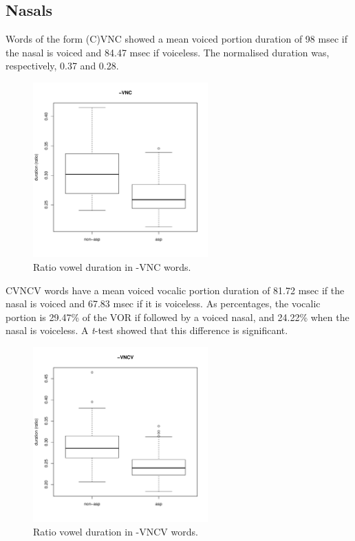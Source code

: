 \documentclass[11pt,a4paper,openany]{memoir}\usepackage[]{graphicx}\usepackage[]{color}
\newenvironment{knitrout}{}{} %
\begin{document}
\subsection{Nasals}


Words of the form (C)VNC showed a mean voiced portion duration of 98 msec if the nasal is voiced and 84.47 msec if voiceless.
The normalised duration was, respectively, 0.37 and 0.28.

\begin{figure}
\centering
\begin{knitrout}
\color{fgcolor}
\includegraphics[width=0.6\textwidth]{img/mono-nas-box-1} 

\end{knitrout}
\caption{Ratio vowel duration in -VNC words.}
\label{f:mononas}
\end{figure}



CVNCV words have a mean voiced vocalic portion duration of 81.72 msec if the nasal is voiced and 67.83 msec if it is voiceless.
As percentages, the vocalic portion is 29.47\% of the VOR if followed by a voiced nasal, and 24.22\% when the nasal is voiceless.
A \textit{t}-test showed that this difference is significant.

\begin{figure}
\centering
\begin{knitrout}
\color{fgcolor}
\includegraphics[width=0.6\textwidth]{img/di-nas-box-1} 

\end{knitrout}
\caption{Ratio vowel duration in -VNCV words.}
\label{f:dinas}
\end{figure}
\end{document}
